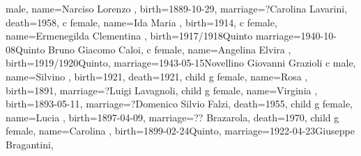\documentclass{article}
\begin{document}
\begin{midpage}
\begin{center}
\begin{genealogypicture}
{{{{{{{                            male,
                            name={Narciso Lorenzo },
                            birth={1889-10-29}{},
                            marriage={?}{Carolina Lavarini},
                            death={1958}{},
                        }
                        c{
                            female,
                            name={Ida Maria },
                            birth={1914}{},
                        }
                        c{
                            female,
                            name={Ermenegilda Clementina },
                            birth={1917/1918}{Quinto}
                            marriage={1940-10-08}{Quinto \newline Bruno Giacomo Caloi},
                        }
                        c{
                            female,
                            name={Angelina Elvira },
                            birth={1919/1920}{Quinto},
                            marriage={1943-05-15}{Novellino Giovanni Grazioli}
                        }
                        c{
                            male,
                            name={Silvino },
                            birth={1921}{},
                            death={1921}{},
                        }
                    }
                    child{
                        g{
                            female,
                            name={Rosa },
                            birth={1891}{},
                            marriage={?}{Luigi Lavagnoli},
                        }
                    }
                    child{
                        g{
                            female,
                            name={Virginia },
                            birth={1893-05-11}{},
                            marriage={?}{Domenico Silvio Falzi},
                            death={1955}{},
                        }
                    }
                    child{
                        g{
                            female,
                            name={Lucia },
                            birth={1897-04-09}{},
                            marriage={?}{? Brazarola},
                            death={1970}{},
                        }
                    }
                    child{
                        g{
                            female,
                            name={Carolina },
                            birth={1899-02-24}{Quinto},
                            marriage={1922-04-23}{Giuseppe Bragantini},
}}}}}}}
\end{genealogypicture}
\end{center}
\end{midpage}
\end{document}
